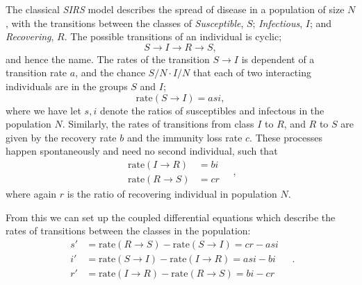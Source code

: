 \documentclass[]{article}
\begin{document}
The classical \textit{SIRS} model describes the spread of disease in a population of size $N$, with the transitions between the classes of \textit{Susceptible}, $S$; \textit{Infectious}, $I$; and \textit{Recovering}, $R$. The possible transitions of an individual is cyclic;
\begin{equation}
	S \rightarrow I \rightarrow R \rightarrow S,
\end{equation}
and hence the name. The rates of the transition $S \rightarrow I$ is dependent of a transition rate $a$, and the chance $S/N \cdot I/N$ that each of two interacting individuals are in the groups $S$ and $I$;
\begin{equation}
	\mathrm{rate}(S \rightarrow I) = asi,
\end{equation}
where we have let $s,i$ denote the ratios of susceptibles and infectous in the population $N$. Similarly, the rates of transitions from class $I$ to $R$, and $R$ to $S$ are given by the recovery rate $b$ and the immunity loss rate $c$. These processes happen spontaneously and need no second individual, such that
\begin{equation}
\begin{aligned}
	\mathrm{rate}(I \rightarrow R) &= bi \\
	\mathrm{rate}(R \rightarrow S) &= cr
\end{aligned} \quad,
\end{equation}
where again $r$ is the ratio of recovering individual in population $N$.

From this we can set up the coupled differential equations which describe the rates of transitions between the classes in the population:
\begin{equation} \label{eq:sirs-classic}
\begin{aligned}
	s' &= \mathrm{rate}(R \rightarrow S) - \mathrm{rate}(S \rightarrow I) = cr - asi \\
	i' &= \mathrm{rate}(S \rightarrow I) - \mathrm{rate}(I \rightarrow R) = asi - bi \\
	r' &= \mathrm{rate}(I \rightarrow R) - \mathrm{rate}(R \rightarrow S) = bi - cr
\end{aligned} \quad .
\end{equation}
\end{document}
